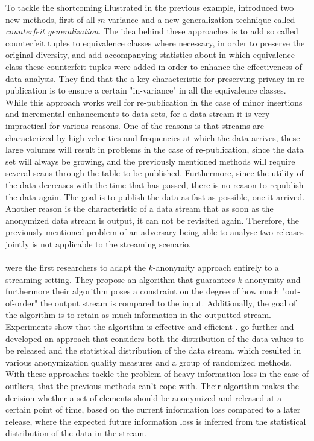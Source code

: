 \noindent To tackle the shortcoming illustrated in the previous example,  introduced two new methods, first of all $m$-variance and a new generalization technique called \textit{counterfeit generalization}. The idea behind these approaches is to add so called counterfeit tuples to equivalence classes where necessary, in order to preserve the original diversity, and add accompanying statistics about in which equivalence class these counterfeit tuples were added in order to enhance the effectiveness of data analysis. They find that the a key characteristic for preserving privacy in re-publication is to ensure a certain "in-variance" in all the equivalence classes. While this approach works well for re-publication in the case of minor insertions and incremental enhancements to data sets, for a data stream it is very impractical for various reasons. One of the reasons is that streams are characterized by high velocities and frequencies at which the data arrives, these large volumes will result in problems in the case of re-publication, since the data set will always be growing, and the previously mentioned methods will require several scans through the table to be published. Furthermore, since the utility of the data decreases with the time that has passed, there is no reason to republish the data again. The goal is to publish the data as fast as possible, one it arrived. Another reason is the characteristic of a data stream that as soon as the anonymized data stream is output, it can not be revisited again. Therefore, the previously mentioned problem of an adversary being able to analyse two releases jointly is not applicable to the streaming scenario.\\
\\
 were the first researchers to adapt the $k$-anonymity approach entirely to a streaming setting. They propose an algorithm that guarantees $k$-anonymity and furthermore their algorithm poses a constraint on the degree of how much "out-of-order" the output stream is compared to the input. Additionally, the goal of the algorithm is to retain as much information in the outputted stream. 
Experiments show that the algorithm is effective and efficient \cite{li2008}.  go further and developed an approach that considers both the distribution of the data values to be released and the statistical distribution of the data stream, which resulted in various anonymization quality measures and a group of randomized methods. With these approaches  tackle the problem of heavy information loss in the case of outliers, that the previous methods can't cope with. Their algorithm makes the decision whether a set of elements should be anonymized and released at a certain point of time, based on the current information loss compared to a later release, where the expected future information loss is inferred from the statistical distribution of the data in the stream.\\

